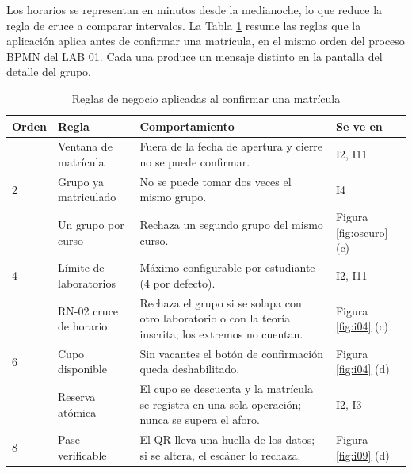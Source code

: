 \vspace{0.2cm}

Los horarios se representan en minutos desde la medianoche, lo que reduce la regla de cruce a comparar intervalos. La Tabla \ref{tab:reglas} resume las reglas que la aplicación aplica antes de confirmar una matrícula, en el mismo orden del proceso BPMN del LAB 01. Cada una produce un mensaje distinto en la pantalla del detalle del grupo.

\begin{table}[H]
\centering\small
\caption{Reglas de negocio aplicadas al confirmar una matrícula}\label{tab:reglas}
\renewcommand{\arraystretch}{1.25}
\begin{tabular}{|>{\raggedright\arraybackslash}p{}|>{\raggedright\arraybackslash}p{}|>{\raggedright\arraybackslash}p{}|>{\raggedright\arraybackslash}p{}|}
\hline
\rowcolor{colabpyblue} \color{white}\textbf{Orden} & \color{white}\textbf{Regla} & \color{white}\textbf{Comportamiento} & \color{white}\textbf{Se ve en} \\ \hline
1 & Ventana de matrícula & Fuera de la fecha de apertura y cierre no se puede confirmar. & I2, I11 \\ \hline
\rowcolor{colabpybg} 2 & Grupo ya matriculado & No se puede tomar dos veces el mismo grupo. & I4 \\ \hline
3 & Un grupo por curso & Rechaza un segundo grupo del mismo curso. & Figura \ref{fig:oscuro} (c) \\ \hline
\rowcolor{colabpybg} 4 & Límite de laboratorios & Máximo configurable por estudiante (4 por defecto). & I2, I11 \\ \hline
5 & RN-02 cruce de horario & Rechaza el grupo si se solapa con otro laboratorio o con la teoría inscrita; los extremos no cuentan. & Figura \ref{fig:i04} (c) \\ \hline
\rowcolor{colabpybg} 6 & Cupo disponible & Sin vacantes el botón de confirmación queda deshabilitado. & Figura \ref{fig:i04} (d) \\ \hline
7 & Reserva atómica & El cupo se descuenta y la matrícula se registra en una sola operación; nunca se supera el aforo. & I2, I3 \\ \hline
\rowcolor{colabpybg} 8 & Pase verificable & El QR lleva una huella de los datos; si se altera, el escáner lo rechaza. & Figura \ref{fig:i09} (d) \\ \hline
\end{tabular}
\end{table}

